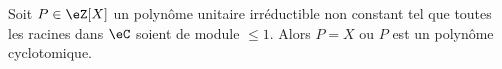 %
%
%

\begin{theorem} \label{ThojCJpFW}
    Soit \( P\in \eZ[X]\) un polynôme unitaire irréductible non constant tel que toutes les racines dans \( \eC\) soient de module \( \leq 1\). Alors \( P=X\) ou \( P\) est un polynôme cyclotomique.
\end{theorem}

